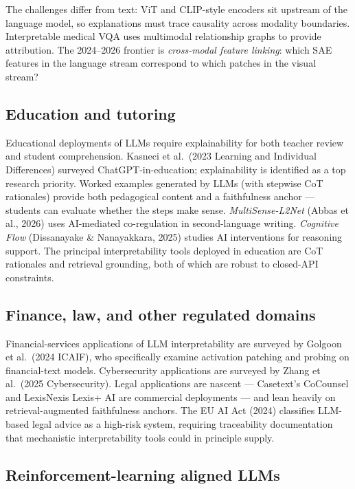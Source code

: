 \documentclass{article}
\begin{document}
The challenges differ from text: ViT and CLIP-style encoders sit upstream of the language model, so explanations must trace causality across modality boundaries. Interpretable medical VQA \citep{hu2024understandingreaso} uses multimodal relationship graphs to provide attribution. The 2024--2026 frontier is \emph{cross-modal feature linking}: which SAE features in the language stream correspond to which patches in the visual stream?

\subsection{Education and tutoring}\label{education-and-tutoring}

Educational deployments of LLMs require explainability for both teacher review and student comprehension. Kasneci et al.~(2023 Learning and Individual Differences) surveyed ChatGPT-in-education; explainability is identified as a top research priority. Worked examples generated by LLMs (with stepwise CoT rationales) provide both pedagogical content and a faithfulness anchor --- students can evaluate whether the steps make sense. \emph{MultiSense-L2Net} (Abbas et al., 2026) uses AI-mediated co-regulation in second-language writing. \emph{Cognitive Flow} (Dissanayake \& Nanayakkara, 2025) studies AI interventions for reasoning support. The principal interpretability tools deployed in education are CoT rationales and retrieval grounding, both of which are robust to closed-API constraints.

\subsection{Finance, law, and other regulated domains}\label{finance-law-and-other-regulated-domains}

Financial-services applications of LLM interpretability are surveyed by Golgoon et al.~(2024 ICAIF), who specifically examine activation patching and probing on financial-text models. Cybersecurity applications are surveyed by Zhang et al.~(2025 Cybersecurity). Legal applications are nascent --- Casetext's CoCounsel and LexisNexis Lexis+ AI are commercial deployments --- and lean heavily on retrieval-augmented faithfulness anchors. The EU AI Act (2024) classifies LLM-based legal advice as a high-risk system, requiring traceability documentation that mechanistic interpretability tools could in principle supply.

\subsection{Reinforcement-learning aligned LLMs}\label{reinforcement-learning-aligned-llms}
\end{document}
